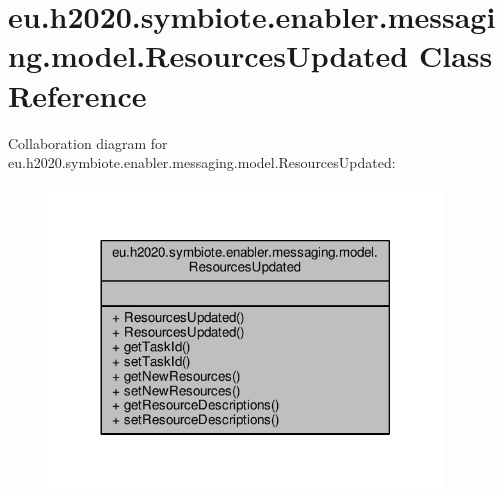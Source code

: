 \hypertarget{classeu_1_1h2020_1_1symbiote_1_1enabler_1_1messaging_1_1model_1_1ResourcesUpdated}{}\section{eu.\+h2020.\+symbiote.\+enabler.\+messaging.\+model.\+Resources\+Updated Class Reference}
\label{classeu_1_1h2020_1_1symbiote_1_1enabler_1_1messaging_1_1model_1_1ResourcesUpdated}


Collaboration diagram for eu.\+h2020.\+symbiote.\+enabler.\+messaging.\+model.\+Resources\+Updated\+:\nopagebreak
\begin{figure}[H]
\begin{center}
\leavevmode
\includegraphics[width=296pt]{classeu_1_1h2020_1_1symbiote_1_1enabler_1_1messaging_1_1model_1_1ResourcesUpdated__coll__graph}
\end{center}
\end{figure}
